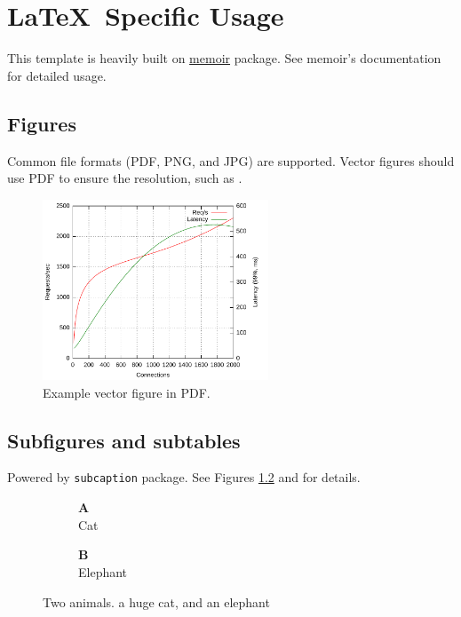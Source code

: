\chapter{{\LaTeX}\ Specific Usage}

This template is heavily built on \href{https://www.ctan.org/pkg/memoir}{memoir} package. See memoir's documentation for detailed usage.

\section{Figures}
Common file formats (PDF, PNG, and JPG) are supported. Vector figures should use PDF to ensure the resolution, such as .

\begin{figure}[tbh]
  \centering
  \includegraphics[width=0.6\textwidth]{figures/just-a-plot}
  \caption{Example vector figure in PDF.}
  \label{fig:vector}
\end{figure}

\section{Subfigures and subtables}
Powered by \texttt{subcaption} package.
See Figures \ref{fig:subfigdemo-cat} and  for details.

\begin{figure}
    \begin{subfigure}[b]{.5\linewidth}
        \centering
        \textbf{A}\\ \Large Cat
        \label{fig:subfigdemo-cat}
    \end{subfigure}%
    \begin{subfigure}[b]{.5\linewidth}
        \centering
        \textbf{B}\\ \Large Elephant
        \label{fig:subfigdemo-elephant}
    \end{subfigure}
    \caption{Two animals.  a huge cat,
    and  an elephant}
    \label{fig:subfigdemo}
\end{figure}

